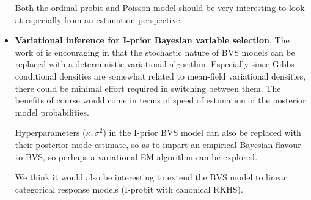 \documentclass[a4paper,showframe,11pt]{report}
\begin{document}
\begin{itemize}
  Both the ordinal probit and Poisson model should be very interesting to look at especially from an estimation perspective.

  \item \textbf{Variational inference for I-prior Bayesian variable selection}.
  The work of \citet{ormerod2017variational} is encouraging in that the stochastic nature of BVS models can be replaced with a deterministic variational algorithm.
  Especially since Gibbs conditional densities are somewhat related to mean-field variational densities, there could be minimal effort required in switching between them.
  The benefits of course would come in terms of speed of estimation of the posterior model probabilities.
  
  Hyperparameters ($\kappa,\sigma^2$) in the I-prior BVS model can also be replaced with their posterior mode estimate, so as to impart an empirical Bayesian flavour to BVS, so perhaps a variational EM algorithm can be explored.
  
  We think it would also be interesting to extend the BVS model to linear categorical response models (I-probit with canonical RKHS).
  

\end{itemize}




\hClosingStuffStandalone
\end{document}
